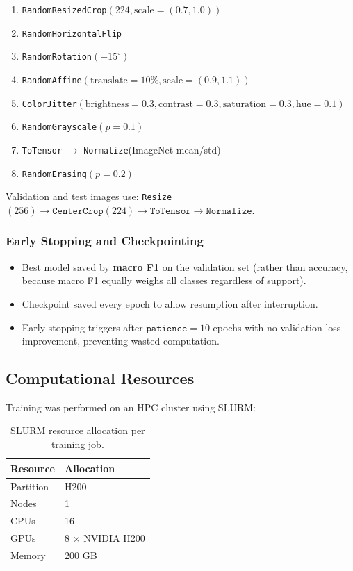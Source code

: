 \documentclass[12pt, a4paper]{article}
\begin{document}
\begin{enumerate}[leftmargin=*]
    \item \texttt{RandomResizedCrop}$(224, \text{scale}=(0.7, 1.0))$
    \item \texttt{RandomHorizontalFlip}
    \item \texttt{RandomRotation}$(\pm 15^{\circ})$
    \item \texttt{RandomAffine}$(\text{translate}=10\%, \text{scale}=(0.9, 1.1))$
    \item \texttt{ColorJitter}$(\text{brightness}=0.3, \text{contrast}=0.3,
          \text{saturation}=0.3, \text{hue}=0.1)$
    \item \texttt{RandomGrayscale}$(p=0.1)$
    \item \texttt{ToTensor} $\to$ \texttt{Normalize}(ImageNet mean/std)
    \item \texttt{RandomErasing}$(p=0.2)$
\end{enumerate}

Validation and test images use: \texttt{Resize}$(256) \to
\texttt{CenterCrop}(224) \to \texttt{ToTensor} \to \texttt{Normalize}$.

\subsubsection{Early Stopping and Checkpointing}

\begin{itemize}[leftmargin=*]
    \item Best model saved by \textbf{macro F1} on the validation set (rather
          than accuracy, because macro F1 equally weighs all classes regardless
          of support).
    \item Checkpoint saved every epoch to allow resumption after interruption.
    \item Early stopping triggers after $\texttt{patience} = 10$ epochs with no
          validation loss improvement, preventing wasted computation.
\end{itemize}

\subsection{Computational Resources}

Training was performed on an HPC cluster using SLURM:

\begin{table}[H]
\centering
\caption{SLURM resource allocation per training job.}
\label{tab:slurm}
\begin{tabular}{ll}
\toprule
\textbf{Resource} & \textbf{Allocation} \\
\midrule
Partition & H200 \\
Nodes     & 1 \\
CPUs      & 16 \\
GPUs      & 8 $\times$ NVIDIA H200 \\
Memory    & 200 GB \\
\bottomrule
\end{tabular}
\end{table}
\end{document}
